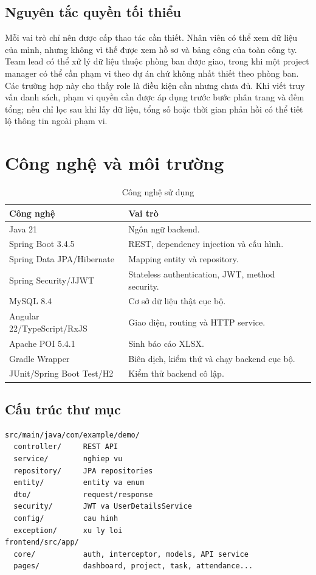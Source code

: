 \documentclass[12pt,a4paper,oneside]{report}
\begin{document}
\subsection{Nguyên tắc quyền tối thiểu}
Mỗi vai trò chỉ nên được cấp thao tác cần thiết. Nhân viên có thể xem dữ liệu của mình, nhưng không vì thế được xem hồ sơ và bảng công của toàn công ty. Team lead có thể xử lý dữ liệu thuộc phòng ban được giao, trong khi một project manager có thể cần phạm vi theo dự án chứ không nhất thiết theo phòng ban. Các trường hợp này cho thấy role là điều kiện cần nhưng chưa đủ. Khi viết truy vấn danh sách, phạm vi quyền cần được áp dụng trước bước phân trang và đếm tổng; nếu chỉ lọc sau khi lấy dữ liệu, tổng số hoặc thời gian phản hồi có thể tiết lộ thông tin ngoài phạm vi.

\section{Công nghệ và môi trường}
\begin{table}[H]\centering\caption{Công nghệ sử dụng}
\begin{tabularx}{\textwidth}{p{4cm}X}\toprule\textbf{Công nghệ}&\textbf{Vai trò}\\\midrule
Java 21&Ngôn ngữ backend.\\
Spring Boot 3.4.5&REST, dependency injection và cấu hình.\\
Spring Data JPA/Hibernate&Mapping entity và repository.\\
Spring Security/JJWT&Stateless authentication, JWT, method security.\\
MySQL 8.4&Cơ sở dữ liệu thật cục bộ.\\
Angular 22/TypeScript/RxJS&Giao diện, routing và HTTP service.\\
Apache POI 5.4.1&Sinh báo cáo XLSX.\\
Gradle Wrapper&Biên dịch, kiểm thử và chạy backend cục bộ.\\
JUnit/Spring Boot Test/H2&Kiểm thử backend cô lập.\\\bottomrule
\end{tabularx}\end{table}

\subsection{Cấu trúc thư mục}
\begin{lstlisting}[language={},caption={Cấu trúc rút gọn}]
src/main/java/com/example/demo/
  controller/     REST API
  service/        nghiep vu
  repository/     JPA repositories
  entity/         entity va enum
  dto/            request/response
  security/       JWT va UserDetailsService
  config/         cau hinh
  exception/      xu ly loi
frontend/src/app/
  core/           auth, interceptor, models, API service
  pages/          dashboard, project, task, attendance...
\end{lstlisting}
\end{document}
